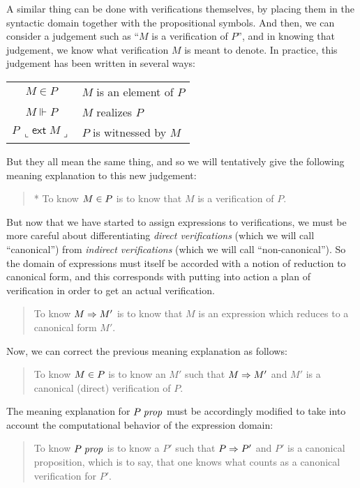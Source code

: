 \documentclass[main.tex]{subfiles}
\begin{document}
A similar thing can be done with verifications themselves, by placing them in
the syntactic domain together with the propositional symbols. And then, we can
consider a judgement such as ``$M$ is a verification of $P$'', and in knowing
that judgement, we know what verification $M$ is meant to denote. In practice,
this judgement has been written in several ways:\\\medskip
\begin{tabular}{c|l}
  $M\in P$ & $M$ is an element of $P$\\
  $M\Vdash P$ & $M$ realizes $P$\\
  $P\ \llcorner\mathsf{ext}\; M\lrcorner$ & $P$ is witnessed by $M$
\end{tabular}

But they all mean the same thing, and so we will tentatively give the following
meaning explanation to this new judgement:
\begin{quote}
  * To know $M\in P$ is to know that $M$ is a verification of $P$.
\end{quote}

But now that we have started to assign expressions to verifications, we must be
more careful about differentiating \emph{direct verifications} (which we will
call ``canonical'') from \emph{indirect verifications} (which we will call
``non-canonical''). So the domain of expressions must itself be accorded with a
notion of reduction to canonical form, and this corresponds with putting into
action a plan of verification in order to get an actual verification.

\begin{quote}
  To know $M\Rightarrow M'$ is to know that $M$ is an expression which reduces to
  a canonical form $M'$.
\end{quote}

Now, we can correct the previous meaning explanation as follows:

\begin{quote}
  To know $M\in P$ is to know an $M'$ such that $M\Rightarrow M'$ and $M'$ is a
  canonical (direct) verification of $P$.
\end{quote}

The meaning explanation for $P\;\mathit{prop}$ must be accordingly modified to take
into account the computational behavior of the expression domain:

\begin{quote}
  To know $P\;\mathit{prop}$ is to know a $P'$ such that $P\Rightarrow P'$ and $P'$ is a
  canonical proposition, which is to say, that one knows what counts as a
  canonical verification for $P'$.
\end{quote}
\end{document}
